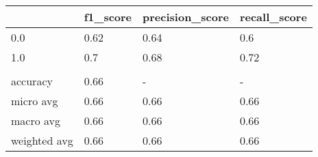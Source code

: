 \begin{tabular}{llll}
\toprule
{} & f1\_score & precision\_score & recall\_score \\
\midrule
0.0          &     0.62 &            0.64 &          0.6 \\
1.0          &      0.7 &            0.68 &         0.72 \\
             &          &                 &              \\
accuracy     &     0.66 &               - &            - \\
micro avg    &     0.66 &            0.66 &         0.66 \\
macro avg    &     0.66 &            0.66 &         0.66 \\
weighted avg &     0.66 &            0.66 &         0.66 \\
\bottomrule
\end{tabular}
